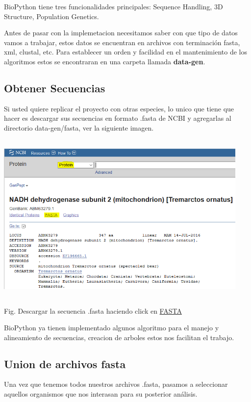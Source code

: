 \documentclass[a4paper]{article}
\begin{document}
\noindent BioPython tiene tres funcionalidades principales:
Sequence Handling, 3D Structure, Population Genetics.


\noindent Antes de pasar con la implemetacion necesitamos saber con que tipo de datos vamos a trabajar, estos datos se encuentran en  archivos con terminación fasta, xml, clustal, etc. Para establecer un orden y facilidad en el mantenimiento de los algoritmos estos se encontraran en una carpeta llamada \textbf{data-gen}.

\subsection{Obtener Secuencias}
\noindent Si usted quiere replicar el proyecto con otras especies, lo unico que tiene que hacer es descargar sus secuencias en formato .fasta de NCBI y agregarlas al directorio data-gen/fasta, ver la siguiente imagen.

\begin{center}
	\includegraphics[width=12.5cm,height=8.5cm]{ncbi_replica.png}
	
	Fig. Descargar la secuencia .fasta haciendo click en \underline{FASTA}
\end{center}

\noindent BioPython ya tienen implementado algunos algoritmo para el manejo y alineamiento de secuencias, creacion de arboles estos nos facilitan el trabajo.

\subsection{Union de archivos fasta}

Una vez que tenemos todos nuestros archivos .fasta, pasamos a seleccionar aquellos organismos que nos interasan para su posterior análisis.
\end{document}
